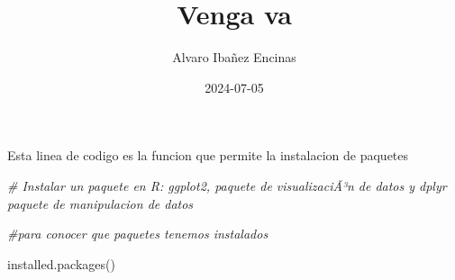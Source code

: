 \documentclass[
]{article}
\title{Venga va}
\author{Alvaro Ibañez Encinas}
\date{2024-07-05}
\newenvironment{Shaded}{\begin{snugshade}}{\end{snugshade}}
\newcommand{\CommentTok}[1]{\textcolor[rgb]{0.56,0.35,0.01}{\textit{#1}}}
\newcommand{\FunctionTok}[1]{\textcolor[rgb]{0.00,0.00,0.00}{#1}}
\newcommand{\NormalTok}[1]{#1}
\begin{document}
\maketitle

Esta linea de codigo es la funcion que permite la instalacion de
paquetes

\begin{Shaded}
\begin{Highlighting}[]
\CommentTok{\# Instalar un paquete en R: ggplot2, paquete de visualizaciÃ³n de datos y dplyr paquete de manipulacion de datos}

\CommentTok{\#para conocer que paquetes tenemos instalados}

\FunctionTok{installed.packages}\NormalTok{()}
\end{Highlighting}
\end{Shaded}
\end{document}
